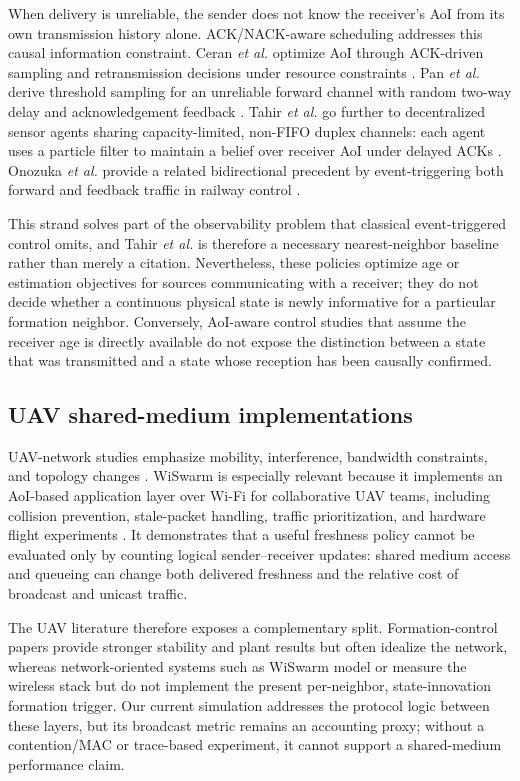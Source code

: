 When delivery is unreliable, the sender does not know the receiver's AoI from
its own transmission history alone. ACK/NACK-aware scheduling addresses this
causal information constraint. Ceran \emph{et al.} optimize AoI through
ACK-driven sampling and retransmission decisions under resource constraints
\cite{ceran2019average}. Pan \emph{et al.} derive threshold sampling for an
unreliable forward channel with random two-way delay and acknowledgement
feedback \cite{pan2023twoway}. Tahir \emph{et al.} go further to decentralized
sensor agents sharing capacity-limited, non-FIFO duplex channels: each agent
uses a particle filter to maintain a belief over receiver AoI under delayed
ACKs \cite{tahir2024collaborative}. Onozuka \emph{et al.} provide a related
bidirectional precedent by event-triggering both forward and feedback traffic
in railway control \cite{onozuka2024aoi}.

This strand solves part of the observability problem that classical
event-triggered control omits, and Tahir \emph{et al.} is therefore a necessary
nearest-neighbor baseline rather than merely a citation. Nevertheless, these
policies optimize age or estimation objectives for sources communicating with
a receiver; they do not decide whether a continuous physical state is newly
informative for a particular formation neighbor. Conversely, AoI-aware control
studies that assume the receiver age is directly available do not expose the
distinction between a state that was transmitted and a state whose reception
has been causally confirmed.

\subsection{UAV shared-medium implementations}

UAV-network studies emphasize mobility, interference, bandwidth constraints,
and topology changes \cite{gupta2016survey,zeng2016wireless,mozaffari2019tutorial}.
WiSwarm is especially relevant because it implements an AoI-based application
layer over Wi-Fi for collaborative UAV teams, including collision prevention,
stale-packet handling, traffic prioritization, and hardware flight experiments
\cite{tripathi2023wiswarm}. It demonstrates that a useful freshness policy
cannot be evaluated only by counting logical sender--receiver updates: shared
medium access and queueing can change both delivered freshness and the relative
cost of broadcast and unicast traffic.

The UAV literature therefore exposes a complementary split. Formation-control
papers provide stronger stability and plant results but often idealize the
network, whereas network-oriented systems such as WiSwarm model or measure the
wireless stack but do not implement the present per-neighbor, state-innovation
formation trigger. Our current simulation addresses the protocol logic between
these layers, but its broadcast metric remains an accounting proxy; without a
contention/MAC or trace-based experiment, it cannot support a shared-medium
performance claim.

